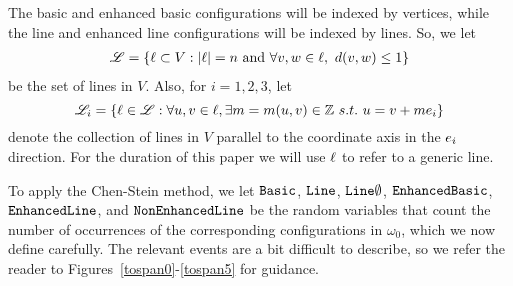 The basic and enhanced basic configurations will be indexed by vertices, while the line and enhanced line configurations will be indexed by lines.  So, we let
\begin{align*}
\mathscr{L} = \{\ell \subset V: \left|\ell\right| = n \text{ and } \forall { v},{ w}\in \ell,\ d({ v}, { w}) \leq 1 \}
\end{align*}
be the set of lines in $V$.  Also, for $i=1,2,3$, let
\begin{equation*}
\mathscr{L}_i = \{\ell\in \mathscr{L}: \forall { u},{ v}\in \ell, \exists m = m({ u},{ v}) \in \mathbb{Z} \ s.t. \ { u} = { v} + m { e_i} \}
\end{equation*}
denote the collection of lines in $V$ parallel to the coordinate axis in the ${ e_i}$ direction.  For the duration of this paper we will use $\ell$ to refer to a generic line.

To apply the Chen-Stein method, we let $\operatorname{\tt Basic}$, $\operatorname{\tt Line}$, $\operatorname{\tt Line\emptyset}$, $\operatorname{\tt Enhanced Basic}$, $\operatorname{\tt Enhanced Line}$, and $\operatorname{\tt NonEnhancedLine}$ be the random variables that count the number of occurrences of the corresponding configurations in $\omega_0$, which we now define carefully.  The relevant events are a bit difficult to describe, so we refer the reader to Figures~\ref{tospan0}-\ref{tospan5} for guidance.

